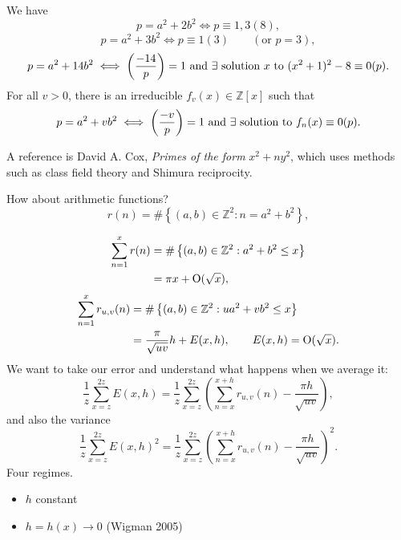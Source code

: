 \documentclass[reqno]{amsart} 
\begin{document}
We have
\begin{equation*}
  p = a^2 + 2 b^2 \iff
  p \equiv 1,3(8),
\end{equation*}
\begin{equation*}
  p = a^2 + 3 b^2
  \iff
  p \equiv 1(3) \qquad (\text{or } p = 3),
\end{equation*}
\begin{equation*}
  p = a^2 + 14 b^2 \iff \left( \frac{-14}{p} \right) = 1
  \text{ and $\exists$ solution $x$ to } (x^2 + 1 )^2 - 8 \equiv 0 (p).
\end{equation*}
For all $v > 0$, there is an irreducible $f_v (x) \in \mathbb{Z} [x]$ such that
\begin{equation*}
  p = a^2 + v b^2
  \iff
  \left( \frac{-v}{p} \right) = 1
  \text{ and $\exists$ solution to }
  f_n(x) \equiv 0 (p).  
\end{equation*}

A reference is David A. Cox, \emph{Primes of the form} $x^2 + n y^2 $, which uses methods such as class field theory and Shimura reciprocity.

How about arithmetic functions?
\begin{equation*}
  r (n) = \# \left\{ (a, b) \in \mathbb{Z}^2 : n = a^2 + b^2 \right\},
\end{equation*}

\begin{align*}
  \sum_{n = 1}^x r (n ) &= \# \left\{ (a, b ) \in \mathbb{Z}^2 : a^2 + b^2 \leq x \right\}\\
                        &= \pi x + \operatorname{O}(\sqrt{x}),
\end{align*}
\begin{align*}
  \sum_{n = 1}^x r_{u, v} (n) &= \# \left\{ (a, b) \in \mathbb{Z}^2 : u a^2 + v b^2 \leq x \right\} \\
                              &=
                                \frac{\pi }{\sqrt{u v}} h + E(x,h), \qquad E(x,h) = \operatorname{O}(\sqrt{x}).
\end{align*}
We want to take our error and understand what happens when we average it:
\begin{equation*}
  \frac{1}{z} \sum_{x = z }^{2 z } E (x, h)
  =
  \frac{1}{z} \sum_{x = z}^{2 z} \left( \sum_{n = x}^{x + h} r_{u, v} (n) - \frac{\pi h}{\sqrt{u v}} \right),
\end{equation*}
and also the variance
\begin{equation*}
  \frac{1}{z} \sum_{x = z}^{2 z} E (x, h)^2
  =
  \frac{1}{z} \sum_{x = z}^{2 z} \left( \sum_{n = x}^{x + h} r_{u, v} (n) - \frac{\pi h}{\sqrt{u v}} \right)^2.
\end{equation*}
Four regimes.
\begin{itemize}
\item $h$ constant
\item $h = h(x) \rightarrow 0$ (Wigman 2005)
\end{itemize}
\end{document}
